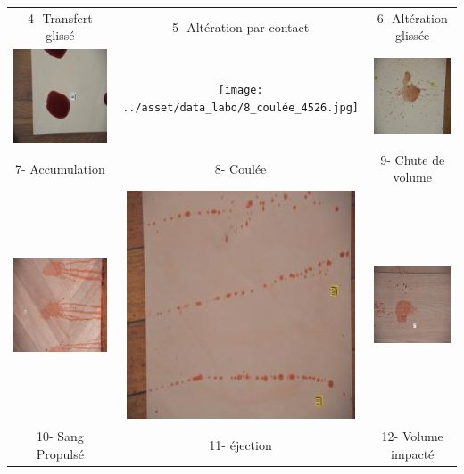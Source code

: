 \documentclass[a4paper]{article}
\begin{document}
\begin{appendices}
\begin{table}[H]
\begin{tabular}{ccc}
        4- Transfert glissé & 5- Altération par contact & 6- Altération glissée \\
        \includegraphics[width=0.20\linewidth]{../asset/data_labo/7_carrelage_5507.jpg} & \texttt{[image: ../asset/data\_labo/8\_coulée\_4526.jpg]} & \includegraphics[width=0.20\linewidth]{../asset/data_labo/9_papier_6375.jpg} \\
        7- Accumulation & 8- Coulée & 9- Chute de volume \\
        \includegraphics[width=0.20\linewidth]{../asset/data_labo/10_lino_933.jpg} & \includegraphics[width=0.20\linewidth]{../asset/data_labo/11_carrelage_905.jpg} & \includegraphics[width=0.20\linewidth]{../asset/data_labo/12_bois_326.jpg} \\
        10- Sang Propulsé & 11- éjection & 12- Volume impacté \\

\end{tabular}
\end{table}
\end{appendices}
\end{document}

